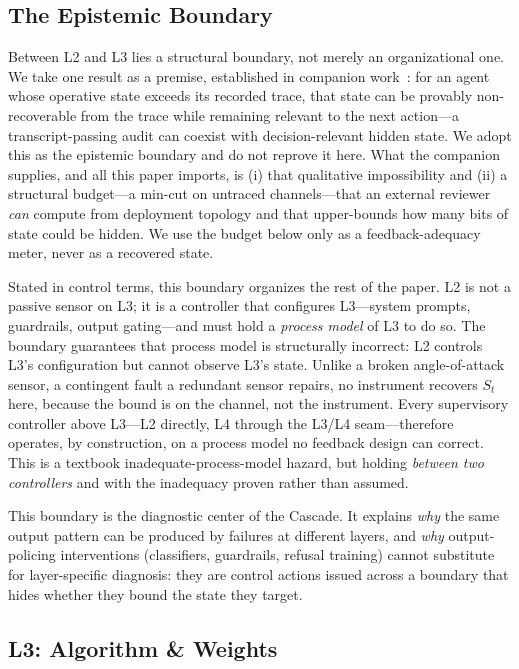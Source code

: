 \documentclass[11pt]{article}
\begin{document}
\subsection{The Epistemic Boundary}

Between L2 and L3 lies a structural boundary, not merely an organizational one. We take one result as a premise, established in companion work~\cite{anon2026dual}: for an agent whose operative state exceeds its recorded trace, that state can be provably non-recoverable from the trace while remaining relevant to the next action---a transcript-passing audit can coexist with decision-relevant hidden state. We adopt this as the epistemic boundary and do not reprove it here. What the companion supplies, and all this paper imports, is (i) that qualitative impossibility and (ii) a structural budget---a min-cut on untraced channels---that an external reviewer \emph{can} compute from deployment topology and that upper-bounds how many bits of state could be hidden. We use the budget below only as a feedback-adequacy meter, never as a recovered state.

Stated in control terms, this boundary organizes the rest of the paper. L2 is not a passive sensor on L3; it is a controller that configures L3---system prompts, guardrails, output gating---and must hold a \emph{process model} of L3 to do so. The boundary guarantees that process model is structurally incorrect: L2 controls L3's configuration but cannot observe L3's state. Unlike a broken angle-of-attack sensor, a contingent fault a redundant sensor repairs, no instrument recovers $S_t$ here, because the bound is on the channel, not the instrument. Every supervisory controller above L3---L2 directly, L4 through the L3/L4 seam---therefore operates, by construction, on a process model no feedback design can correct. This is a textbook inadequate-process-model hazard, but holding \emph{between two controllers} and with the inadequacy proven rather than assumed.

This boundary is the diagnostic center of the Cascade. It explains \textit{why} the same output pattern can be produced by failures at different layers, and \textit{why} output-policing interventions (classifiers, guardrails, refusal training) cannot substitute for layer-specific diagnosis: they are control actions issued across a boundary that hides whether they bound the state they target.

\subsection{L3: Algorithm \& Weights}
\end{document}
